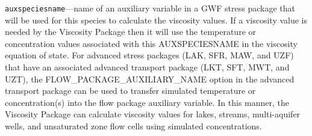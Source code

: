 \begin{description}
\item \texttt{auxspeciesname}---name of an auxiliary variable in a GWF stress package that will be used for this species to calculate the viscosity values.  If a viscosity value is needed by the Viscosity Package then it will use the temperature or concentration values associated with this AUXSPECIESNAME in the viscosity equation of state.  For advanced stress packages (LAK, SFR, MAW, and UZF) that have an associated advanced transport package (LKT, SFT, MWT, and UZT), the FLOW\_PACKAGE\_AUXILIARY\_NAME option in the advanced transport package can be used to transfer simulated temperature or concentration(s) into the flow package auxiliary variable.  In this manner, the Viscosity Package can calculate viscosity values for lakes, streams, multi-aquifer wells, and unsaturated zone flow cells using simulated concentrations.

\end{description}

